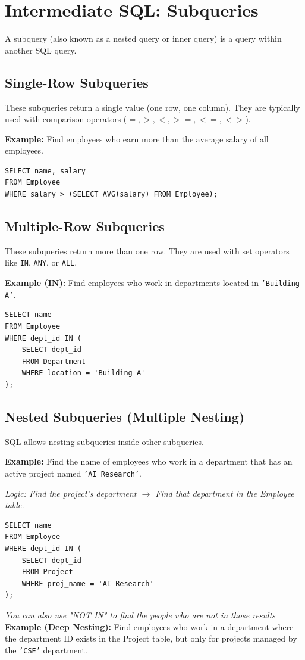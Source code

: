 \documentclass[12pt,a4paper]{article}
\begin{document}
\section{Intermediate SQL: Subqueries}
A subquery (also known as a nested query or inner query) is a query within another SQL query.

\subsection{Single-Row Subqueries}
These subqueries return a single value (one row, one column). They are typically used with comparison operators ($=, >, <, >=, <=, <>$).

\textbf{Example:} Find employees who earn more than the average salary of all employees.

\begin{lstlisting}
SELECT name, salary
FROM Employee
WHERE salary > (SELECT AVG(salary) FROM Employee);
\end{lstlisting}

\subsection{Multiple-Row Subqueries}
These subqueries return more than one row. They are used with set operators like \texttt{IN}, \texttt{ANY}, or \texttt{ALL}.

\textbf{Example (IN):} Find employees who work in departments located in \texttt{'Building A'}.

\begin{lstlisting}
SELECT name
FROM Employee
WHERE dept_id IN (
    SELECT dept_id 
    FROM Department 
    WHERE location = 'Building A'
);
\end{lstlisting}

\subsection{Nested Subqueries (Multiple Nesting)}
SQL allows nesting subqueries inside other subqueries.

\textbf{Example:} Find the name of employees who work in a department that has an active project named \texttt{'AI Research'}.

\textit{Logic: Find the project's department $\rightarrow$ Find that department in the Employee table.}

\begin{lstlisting}
SELECT name
FROM Employee
WHERE dept_id IN (
    SELECT dept_id
    FROM Project
    WHERE proj_name = 'AI Research'
);
\end{lstlisting}
\textit{You can also use "NOT IN" to find the people who are not in those results}
\textbf{Example (Deep Nesting):} Find employees who work in a department where the department ID exists in the Project table, but only for projects managed by the \texttt{'CSE'} department.
\end{document}
